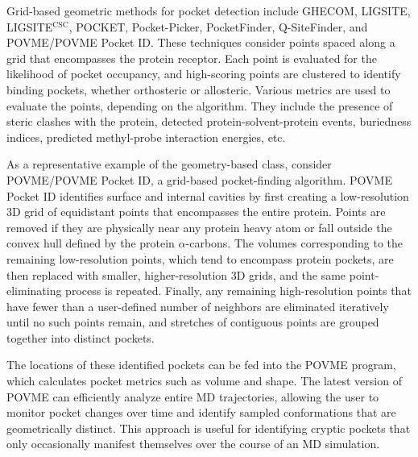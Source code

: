 \par Grid-based geometric methods for pocket detection include GHECOM,\cite{Kawabata2010a} LIGSITE,\cite{Hendlich1997a} LIGSITE$^{\textrm{CSC}}$,\cite{Huang2006a} POCKET,\cite{Levitt1992a} Pocket-Picker,\cite{Weisel2007a} PocketFinder,\cite{An2005a} Q-SiteFinder,\cite{Laurie2005a} and POVME/POVME Pocket ID.\cite{Durrant2014a,Durrant2011} These techniques consider points spaced along a grid that encompasses the protein receptor. Each point is evaluated for the likelihood of pocket occupancy, and high-scoring points are clustered to identify binding pockets, whether orthosteric or allosteric. Various metrics are used to evaluate the points, depending on the algorithm. They include the presence of steric clashes with the protein, detected protein-solvent-protein events,\cite{Levitt1992a,Hendlich1997a} buriedness indices,\cite{Weisel2007a} predicted methyl-probe interaction energies,\cite{Laurie2005a,An2005a} etc.
\par As a representative example of the geometry-based class, consider POVME/POVME Pocket ID, a grid-based pocket-finding algorithm.\cite{Durrant2014a,Durrant2011} POVME Pocket ID identifies surface and internal cavities by first creating a low-resolution 3D grid of equidistant points that encompasses the entire protein. Points are removed if they are physically near any protein heavy atom or fall outside the convex hull defined by the protein $\alpha$-carbons. The volumes corresponding to the remaining low-resolution points, which tend to encompass protein pockets, are then replaced with smaller, higher-resolution 3D grids, and the same point-eliminating process is repeated. Finally, any remaining high-resolution points that have fewer than a user-defined number of neighbors are eliminated iteratively until no such points remain, and stretches of contiguous points are grouped together into distinct pockets.
\par The locations of these identified pockets can be fed into the POVME program, which calculates pocket metrics such as volume and shape. The latest version of POVME can efficiently analyze entire MD trajectories, allowing the user to monitor pocket changes over time and identify sampled conformations that are geometrically distinct. This approach is useful for identifying cryptic pockets that only occasionally manifest themselves over the course of an MD simulation.
